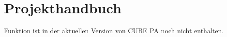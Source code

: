 
\section{Projekthandbuch}

Funktion ist in der aktuellen Version von CUBE PA noch nicht enthalten.


